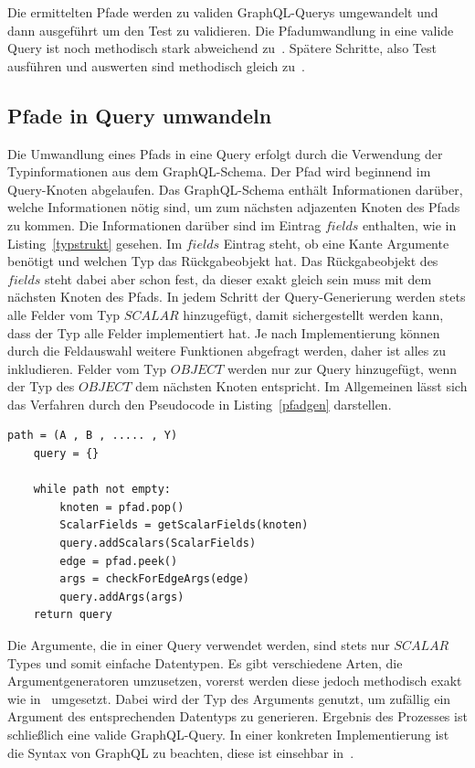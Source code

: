 Die ermittelten Pfade werden zu validen GraphQL-Querys umgewandelt und dann ausgeführt um den Test zu validieren.
Die Pfadumwandlung in eine valide Query ist noch methodisch stark abweichend zu~\cite{property-based-testing}.
Spätere Schritte, also Test ausführen und auswerten sind methodisch gleich zu~\cite{property-based-testing}.

\subsection{Pfade in Query umwandeln}
\label{pfadquery}

Die Umwandlung eines Pfads in eine Query erfolgt durch die Verwendung der Typinformationen aus dem GraphQL-Schema.
Der Pfad wird beginnend im Query-Knoten abgelaufen.
Das GraphQL-Schema enthält Informationen darüber, welche Informationen nötig sind, um zum nächsten adjazenten Knoten des Pfads zu kommen.
Die Informationen darüber sind im Eintrag $fields$ enthalten, wie in Listing~\ref{typstrukt} gesehen.
Im $fields$ Eintrag steht, ob eine Kante Argumente benötigt und welchen Typ das Rückgabeobjekt hat.
Das Rückgabeobjekt des $fields$ steht dabei aber schon fest, da dieser exakt gleich sein muss mit dem nächsten Knoten des Pfads.
In jedem Schritt der Query-Generierung werden stets alle Felder vom Typ $SCALAR$ hinzugefügt, damit sichergestellt werden kann, dass
der Typ alle Felder implementiert hat.
Je nach Implementierung können durch die Feldauswahl weitere Funktionen abgefragt werden, daher ist alles zu inkludieren.
Felder vom Typ $OBJECT$ werden nur zur Query hinzugefügt, wenn der Typ des $OBJECT$ dem nächsten Knoten entspricht.
Im Allgemeinen lässt sich das Verfahren durch den Pseudocode in Listing~\ref{pfadgen} darstellen. \\

\begin{lstlisting}[caption={Pseudocode für Pfadgenerierung},captionpos=b, label={pfadgen}]
    path = (A , B , ..... , Y)
    query = {}

    while path not empty:
        knoten = pfad.pop()
        ScalarFields = getScalarFields(knoten)
        query.addScalars(ScalarFields)
        edge = pfad.peek()
        args = checkForEdgeArgs(edge)
        query.addArgs(args)
    return query
\end{lstlisting}

Die Argumente, die in einer Query verwendet werden, sind stets nur $SCALAR$ Types und somit einfache Datentypen.
Es gibt verschiedene Arten, die Argumentgeneratoren umzusetzen, vorerst werden diese jedoch methodisch exakt wie in~\cite{property-based-testing} umgesetzt.
Dabei wird der Typ des Arguments genutzt, um zufällig ein Argument des entsprechenden Datentyps zu generieren.
Ergebnis des Prozesses ist schließlich eine valide GraphQL-Query.
In einer konkreten Implementierung ist die Syntax von GraphQL zu beachten, diese ist einsehbar in~\cite[2.3 Language Operations]{graphqlspecification}.

